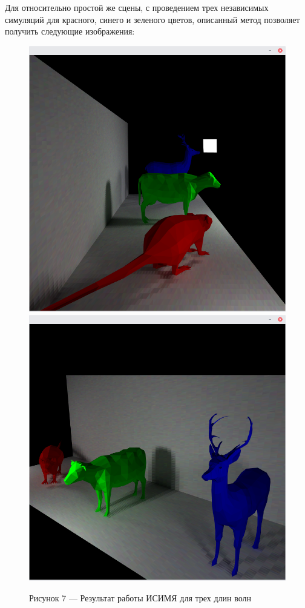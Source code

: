 \documentclass[12pt]{article}
\begin{document}
Для относительно простой же сцены, с проведением трех независимых симуляций для красного, синего и зеленого цветов, описанный метод позволяет получить следующие изображения:
\begin{figure}[h]
\centering
\includegraphics[scale=0.3]{photoshoot_1.png}
\includegraphics[scale=0.3]{photoshoot_2.png}
\caption*{Рисунок 7 --- Результат работы ИСИМЯ для трех длин волн}
\end{figure}
\end{document}
